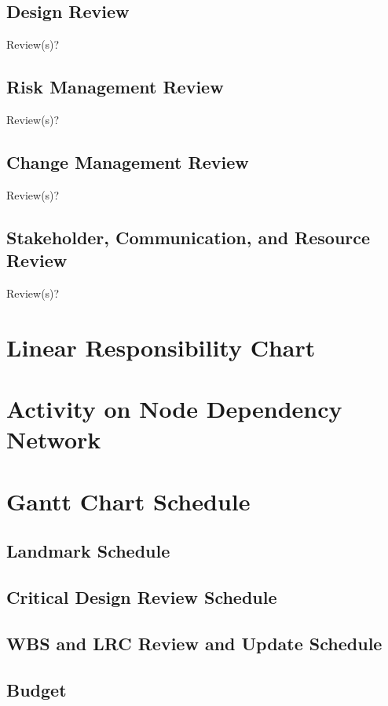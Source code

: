 \subsection{Design Review}
Review(s)?
\subsection{Risk Management Review}
Review(s)?
\subsection{Change Management Review}
Review(s)?
\subsection{Stakeholder, Communication, and Resource Review}
Review(s)?
\section{Linear Responsibility Chart}
\section{Activity on Node Dependency Network}
\section{Gantt Chart Schedule}
\subsection{Landmark Schedule}
\subsection{Critical Design Review Schedule}
\subsection{WBS and LRC Review and Update Schedule}
\subsection{Budget}